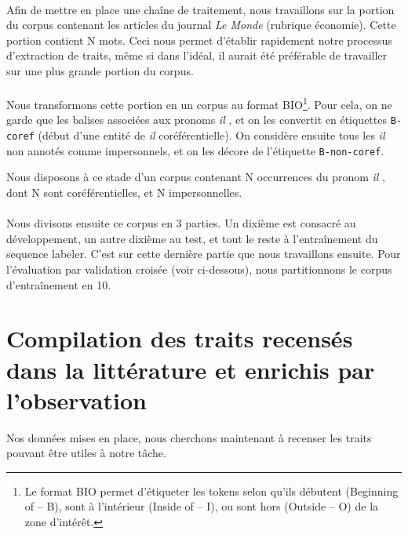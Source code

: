 \documentclass[a4paper,12pt]{article}
\begin{document}
\paragraph{}
Afin de mettre en place une chaîne de traitement, nous travaillons sur la portion du corpus contenant les articles du journal \emph{Le Monde} (rubrique économie). Cette portion contient N mots. Ceci nous permet d'établir rapidement notre processus d'extraction de traits, même si dans l'idéal, il aurait été préférable de travailler sur une plus grande portion du corpus.

\paragraph{}
Nous transformons cette portion en un corpus au format BIO\footnote{Le format BIO permet d'étiqueter les tokens selon qu'ils débutent (Beginning of -- B), sont à l'intérieur (Inside of -- I), ou sont hors (Outside -- O) de la zone d'intérêt.}. Pour cela, on ne garde que les balises associées aux pronoms \og \textit{il} \fg{}, et on les convertit en étiquettes \verb!B-coref! (début d'une entité de \og \textit{il} \fg{} coréférentielle). On considère ensuite tous les \og \textit{il} \fg{} non annotés comme impersonnels, et on les décore de l'étiquette \verb!B-non-coref!.

Nous disposons à ce stade d'un corpus contenant N occurrences du pronom \og \textit{il} \fg{}, dont N sont coréférentielles, et N impersonnelles.

\paragraph{}
Nous divisons ensuite ce corpus en 3 parties. Un dixième est consacré au développement, un autre dixième au test, et tout le reste à l'entraînement du sequence labeler. C'est sur cette dernière partie que nous travaillons ensuite. Pour l'évaluation par validation croisée (voir ci-dessous), nous partitionnons le corpus d'entraînement en 10.

\section{Compilation des traits recensés dans la littérature et enrichis par l'observation}

Nos données mises en place, nous cherchons maintenant à recenser les traits pouvant être utiles à notre tâche.
\end{document}
